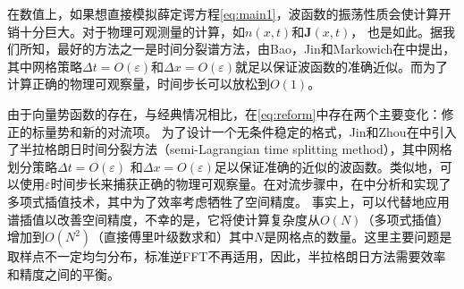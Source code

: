 
在数值上，如果想直接模拟薛定谔方程\eqref{eq:main1}，波函数的振荡性质会使计算开销十分巨大。对于物理可观测量的计算，如$n(x,t)$和$\mathbf{J}(x,t)$，
也是如此。据我们所知，最好的方法之一是时间分裂谱方法，由Bao，Jin和Markowich在中提出，其中网格策略$\Delta t=O(\varepsilon)$和$\Delta x=O(\varepsilon)$就足以保证波函数的准确近似。而为了计算正确的物理可观察量，时间步长可以放松到$O(1)$。


由于向量势函数的存在，与经典情况相比，在\eqref{eq:reform}中存在两个主要变化：修正的标量势和新的对流项。
为了设计一个无条件稳定的格式，Jin和Zhou在中引入了半拉格朗日时间分裂方法（semi-Lagrangian time splitting method），其中网格划分策略$\Delta t=O(\varepsilon)$ 和$\Delta x=O(\varepsilon)$足以保证准确的近似的波函数。类似地，可以使用$\varepsilon$时间步长来捕获正确的物理可观察量。在对流步骤中，在中分析和实现了多项式插值技术，其中为了效率考虑牺牲了空间精度。
事实上，可以代替地应用谱插值以改善空间精度，不幸的是，它将使计算复杂度从$O(N)$（多项式插值）增加到$O(N^2)$（直接傅里叶级数求和）其中$N$是网格点的数量。这里主要问题是取样点不一定均匀分布，标准逆FFT不再适用，因此，半拉格朗日方法需要效率和精度之间的平衡。

